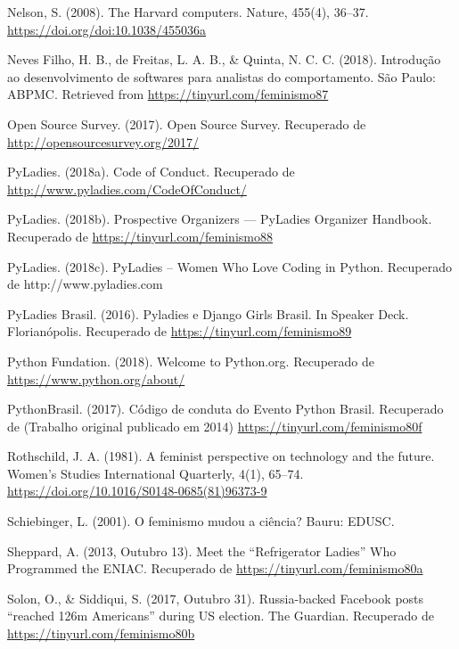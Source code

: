 \hangindent=25pt
\noindent Nelson, S. (2008). The Harvard computers. Nature, 455(4), 36–37. \url{https://doi.org/doi:10.1038/455036a}

\hangindent=25pt
\noindent Neves Filho, H. B., de Freitas, L. A. B., \& Quinta, N. C. C. (2018). Introdução ao desenvolvimento de softwares para analistas do comportamento. São Paulo: ABPMC. Retrieved from \url{https://tinyurl.com/feminismo87}

\hangindent=25pt
\noindent Open Source Survey. (2017). Open Source Survey. Recuperado de \url{http://opensourcesurvey.org/2017/}

\hangindent=25pt
\noindent PyLadies. (2018a). Code of Conduct. Recuperado de \url{http://www.pyladies.com/CodeOfConduct/}

\hangindent=25pt
\noindent PyLadies. (2018b). Prospective Organizers — PyLadies Organizer Handbook. Recuperado de \url{https://tinyurl.com/feminismo88}

\hangindent=25pt
\noindent PyLadies. (2018c). PyLadies – Women Who Love Coding in Python. Recuperado de http://www.pyladies.com

\hangindent=25pt
\noindent PyLadies Brasil. (2016). Pyladies e Django Girls Brasil. In Speaker Deck. Florianópolis. Recuperado de \url{https://tinyurl.com/feminismo89}

\hangindent=25pt
\noindent Python Fundation. (2018). Welcome to Python.org. Recuperado de \url{https://www.python.org/about/}

\hangindent=25pt
\noindent PythonBrasil. (2017). Código de conduta do Evento Python Brasil. Recuperado de \url{} (Trabalho original publicado em 2014) \url{https://tinyurl.com/feminismo80f}

\hangindent=25pt
\noindent Rothschild, J. A. (1981). A feminist perspective on technology and the future. Women’s Studies International Quarterly, 4(1), 65–74. \url{https://doi.org/10.1016/S0148-0685(81)96373-9}

\hangindent=25pt
\noindent Schiebinger, L. (2001). O feminismo mudou a ciência? Bauru: EDUSC.

\hangindent=25pt
\noindent Sheppard, A. (2013, Outubro 13). Meet the “Refrigerator Ladies” Who Programmed the ENIAC. Recuperado de \url{https://tinyurl.com/feminismo80a}

\hangindent=25pt
\noindent Solon, O., \& Siddiqui, S. (2017, Outubro 31). Russia-backed Facebook posts “reached 126m Americans” during US election. The Guardian. Recuperado de \url{https://tinyurl.com/feminismo80b}

